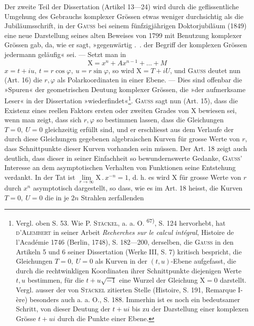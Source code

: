 Der zweite Teil der Dissertation (Artikel 13—24) wird durch die geflissentliche
Umgehung des Gebrauchs komplexer Grössen etwas weniger durchsichtig
als die Jubiläumsschrift, in der \textsc{Gauss} bei seinem fünfzigjährigen Doktorjubiläum
(1849) eine neue Darstellung seines alten Beweises von 1799 mit
Benutzung komplexer Grössen gab, da, wie er sagt, »gegenwärtig .\ . der Begriff
der komplexen Grössen jedermann geläufig« sei. — Setzt man in
\[
\mathrm{X}=x^n+Ax^{n-1}+\ldots+M
\]
\(x=t+iu,\ t=r\cos\varphi,\ u=r\sin\varphi\), so wird \(\mathrm{X}=T+iU\), und \textsc{Gauss} deutet
nun (Art. 16) die \(r,\varphi\) als Polarkoordinaten in einer Ebene. — Dies sind
offenbar die »Spuren« der geometrischen Deutung komplexer Grössen, die »der
aufmerksame Leser« in der Dissertation »wiederfindet«\footnote{Vergl. oben S. 53. Wie \textsc{P. Stäckel}, a. a. O. \textsuperscript{67)}, S. 124 hervorhebt, hat \textsc{d’Alembert} in seiner
Arbeit \textit{Recherches sur le calcul intégral}, Histoire de l’Académie 1746 (Berlin, 1748), S. 182—200, derselben,
die \textsc{Gauss} in den Artikeln 5 und 6 seiner Dissertation (Werke III, S. 7) kritisch bespricht, die Gleichungen
\(T=0,\ U=0\) als Kurven in der \((t,u)\)-Ebene aufgefasst, die durch die rechtwinkligen Koordinaten ihrer
Schnittpunkte diejenigen Werte \(t,u\) bestimmen, für die \(t+u\sqrt{-1}\) eine Wurzel der Gleichung \(\mathrm{X}=0\)
darstellt. Vergl. ausser der von \textsc{Stäckel} zitierten Stelle (Histoire, S. 191, Remarque I-ère) besonders auch
a. a. O., S. 188. Immerhin ist es noch ein bedeutsamer Schritt, von dieser Deutung der  \(t+ui\)
bis zu der Darstellung einer  komplexen Grösse \(t+ui\) durch die Punkte einer Ebene.}. \textsc{Gauss} sagt nun
(Art. 15), dass die Existenz eines reellen Faktors ersten oder zweiten Grades
von \(\mathrm{X}\) bewiesen sei, wenn man zeigt, dass sich \(r,\varphi\) so bestimmen lassen,
dass die Gleichungen \(T=0,\ U=0\) gleichzeitig erfüllt sind, und er erschliesst
aus dem Verlaufe der durch diese Gleichungen gegebenen algebraischen Kurven
für grosse Werte von \(r\), dass Schnittpunkte dieser Kurven vorhanden sein
müssen. Der Art. 18 zeigt auch deutlich, dass dieser in seiner Einfachheit
so bewundernswerte Gedanke, \textsc{Gauss’} Interesse an dem asymptotischen Verhalten
von Funktionen seine Entstehung verdankt. In der Tat ist \(\lim\limits_{r\to\infty}\mathrm{X}\,.\,x^{-n}=1\), d. h.
es wird \(\mathrm{X}\) für grosse Werte von \(r\) durch \(x^n\) asymptotisch dargestellt, so dass,
wie es im Art. 18 heisst, die Kurven \(T=0,\ U=0\) die in je \(2n\) Strahlen zerfallenden
